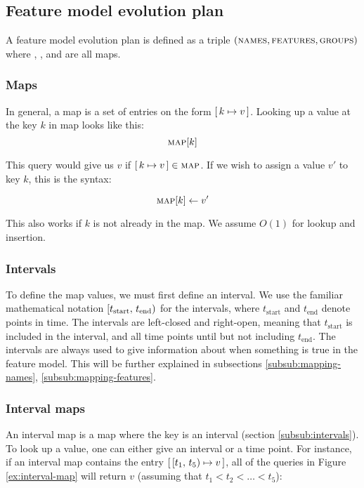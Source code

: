 
\subsection{Feature model evolution plan}
\label{sub:feature-model-evolution-plan}
A feature model evolution plan is defined as a triple $(\textsc{names}, \textsc{features}, \textsc{groups})$ where \names, \features, and \groups{} are all maps.

\subsubsection{Maps}
\label{subsub:maps}
In general, a map is a set of entries on the form $[\,k \mapsto v\,]$. Looking up a value at the key $k$ in map  looks like this:
\[
  \textsc{map}[k]
\]

This query would give us $v$ if $[\,k \mapsto v\,] \in \textsc{map}$. If we wish to assign a value $v'$ to key $k$, this is the syntax:

\[
  \textsc{map}[k] \leftarrow v'
\]

This also works if $k$ is not already in the map. We assume $O(1)$ for lookup and insertion.

\subsubsection{Intervals}
\label{subsub:intervals}
To define the map values, we must first define an interval. We use the familiar mathematical notation $[t_\text{start},\, t_\text{end})$ for the intervals, where $t_\text{start}$ and $t_\text{end}$ denote points in time. The intervals are left-closed and right-open, meaning that $t_\text{start}$ is included in the interval, and all time points until but not including $t_\text{end}$. The intervals are always used to give information about when something is true in the feature model. This will be further explained in subsections \ref{subsub:mapping-names}, \ref{subsub:mapping-features}. 

\subsubsection{Interval maps}
\label{subsub:interval-maps}
An interval map is a map where the key is an interval (section \vref{subsub:intervals}). To look up a value, one can either give an interval or a time point. For instance, if an interval map  contains the entry $[\,[t_1,\, t_5) \mapsto v\,]$, all of the queries in Figure \vref{ex:interval-map} will return $v$ (assuming that $t_1 < t_2 < \ldots < t_5$):

